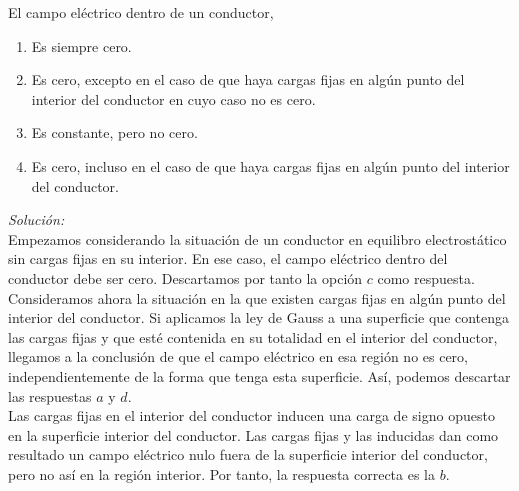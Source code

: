 \vspace{20px}

El campo eléctrico dentro de un conductor,

\begin{enumerate}[label=\alph*.]
    \item Es siempre cero.
    \item Es cero, excepto en el caso de que haya cargas fijas en algún punto del interior del conductor en cuyo caso
    no es cero.
    \item Es constante, pero no cero.
    \item Es cero, incluso en el caso de que haya cargas fijas en algún punto del interior del conductor.
\end{enumerate}

\vspace{20px}
\textit{Solución:}
\\

Empezamos considerando la situación de un conductor en equilibro electrostático sin cargas fijas en su interior. En ese caso,
el campo eléctrico dentro del conductor debe ser cero. Descartamos por tanto la opción $c$ como respuesta.\\

Consideramos ahora la situación en la que existen cargas fijas en algún punto del interior del conductor. Si aplicamos la ley de Gauss a una superficie
que contenga las cargas fijas y que esté contenida en su totalidad en el interior del conductor,  llegamos a la conclusión de
que el campo eléctrico en esa región no es cero, independientemente de la forma
que tenga esta superficie. Así, podemos descartar las respuestas $a$ y $d$.\\

Las cargas fijas en el interior del conductor inducen una carga de signo opuesto en la superficie interior del conductor.
Las cargas fijas y las inducidas dan como resultado un campo eléctrico nulo fuera de la superficie interior del conductor, pero
no así en la región interior. Por tanto, la respuesta correcta es la $b$.






